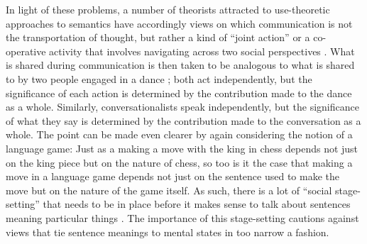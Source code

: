 In light of these problems, a number of theorists attracted to use-theoretic approaches to semantics have accordingly views on which communication is not the transportation of thought, but rather a kind of ``joint action'' \citep{Clark:1996} or a co-operative activity that involves navigating across two social perspectives \citep{Brandom:1994}. What is shared during communication is then taken to be analogous to what is shared to by two people engaged in a dance \citep{Clark:1996,Brandom:2010}; both act independently, but the significance of each action is determined by the contribution made to the dance as a whole. Similarly, conversationalists speak independently, but the significance of what they say is determined by the contribution made to the conversation as a whole. The point can be made even clearer by again considering the notion of a language game: Just as a making a move with the king in chess depends not just on the king piece but on the nature of chess, so too is it the case that making a move in a language game depends not just on the sentence used to make the move but on the nature of the game itself. As such, there is a lot of ``social stage-setting'' that needs to be in place before it makes sense to talk about sentences meaning particular things \citep[][p. 461]{Brandom:1994}. The importance of this stage-setting cautions against views that tie sentence meanings to mental states in too narrow a fashion. 

